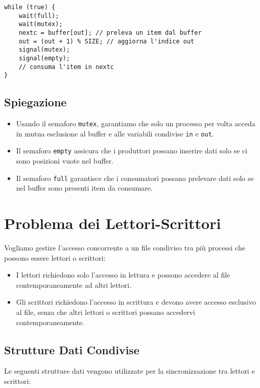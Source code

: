 \begin{verbatim}
while (true) {
    wait(full);
    wait(mutex);
    nextc = buffer[out]; // preleva un item dal buffer
    out = (out + 1) % SIZE; // aggiorna l'indice out
    signal(mutex);
    signal(empty);
    // consuma l'item in nextc
}
\end{verbatim}

\subsection{Spiegazione}
\begin{itemize}
    \item Usando il semaforo \texttt{mutex}, garantiamo che solo un processo per volta acceda in mutua esclusione al buffer e alle variabili condivise \texttt{in} e \texttt{out}.
    \item Il semaforo \texttt{empty} assicura che i produttori possano inserire dati solo se ci sono posizioni vuote nel buffer.
    \item Il semaforo \texttt{full} garantisce che i consumatori possano prelevare dati solo se nel buffer sono presenti item da consumare.
\end{itemize}



\section{Problema dei Lettori-Scrittori}
Vogliamo gestire l'accesso concorrente a un file condiviso tra più processi che possono essere lettori o scrittori:

\begin{itemize}
    \item I lettori richiedono solo l'accesso in lettura e possono accedere al file contemporaneamente ad altri lettori.
    \item Gli scrittori richiedono l'accesso in scrittura e devono avere accesso esclusivo al file, senza che altri lettori o scrittori possano accedervi contemporaneamente.
\end{itemize}

\subsection*{Strutture Dati Condivise}
Le seguenti strutture dati vengono utilizzate per la sincronizzazione tra lettori e scrittori:

